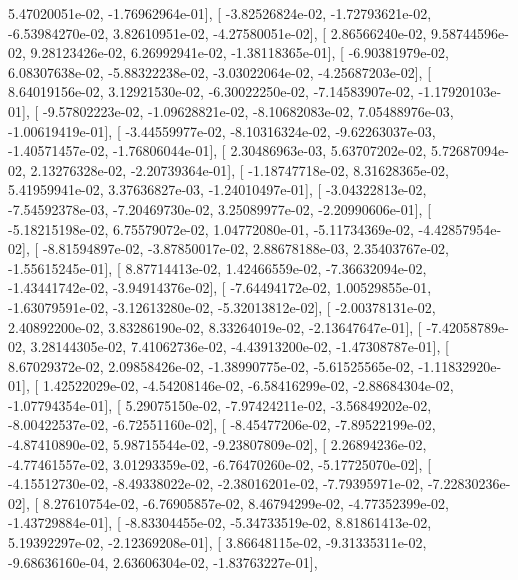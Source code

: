 \documentclass{article}
\begin{document}
          5.47020051e-02,  -1.76962964e-01],
       [ -3.82526824e-02,  -1.72793621e-02,  -6.53984270e-02,
          3.82610951e-02,  -4.27580051e-02],
       [  2.86566240e-02,   9.58744596e-02,   9.28123426e-02,
          6.26992941e-02,  -1.38118365e-01],
       [ -6.90381979e-02,   6.08307638e-02,  -5.88322238e-02,
         -3.03022064e-02,  -4.25687203e-02],
       [  8.64019156e-02,   3.12921530e-02,  -6.30022250e-02,
         -7.14583907e-02,  -1.17920103e-01],
       [ -9.57802223e-02,  -1.09628821e-02,  -8.10682083e-02,
          7.05488976e-03,  -1.00619419e-01],
       [ -3.44559977e-02,  -8.10316324e-02,  -9.62263037e-03,
         -1.40571457e-02,  -1.76806044e-01],
       [  2.30486963e-03,   5.63707202e-02,   5.72687094e-02,
          2.13276328e-02,  -2.20739364e-01],
       [ -1.18747718e-02,   8.31628365e-02,   5.41959941e-02,
          3.37636827e-03,  -1.24010497e-01],
       [ -3.04322813e-02,  -7.54592378e-03,  -7.20469730e-02,
          3.25089977e-02,  -2.20990606e-01],
       [ -5.18215198e-02,   6.75579072e-02,   1.04772080e-01,
         -5.11734369e-02,  -4.42857954e-02],
       [ -8.81594897e-02,  -3.87850017e-02,   2.88678188e-03,
          2.35403767e-02,  -1.55615245e-01],
       [  8.87714413e-02,   1.42466559e-02,  -7.36632094e-02,
         -1.43441742e-02,  -3.94914376e-02],
       [ -7.64494172e-02,   1.00529855e-01,  -1.63079591e-02,
         -3.12613280e-02,  -5.32013812e-02],
       [ -2.00378131e-02,   2.40892200e-02,   3.83286190e-02,
          8.33264019e-02,  -2.13647647e-01],
       [ -7.42058789e-02,   3.28144305e-02,   7.41062736e-02,
         -4.43913200e-02,  -1.47308787e-01],
       [  8.67029372e-02,   2.09858426e-02,  -1.38990775e-02,
         -5.61525565e-02,  -1.11832920e-01],
       [  1.42522029e-02,  -4.54208146e-02,  -6.58416299e-02,
         -2.88684304e-02,  -1.07794354e-01],
       [  5.29075150e-02,  -7.97424211e-02,  -3.56849202e-02,
         -8.00422537e-02,  -6.72551160e-02],
       [ -8.45477206e-02,  -7.89522199e-02,  -4.87410890e-02,
          5.98715544e-02,  -9.23807809e-02],
       [  2.26894236e-02,  -4.77461557e-02,   3.01293359e-02,
         -6.76470260e-02,  -5.17725070e-02],
       [ -4.15512730e-02,  -8.49338022e-02,  -2.38016201e-02,
         -7.79395971e-02,  -7.22830236e-02],
       [  8.27610754e-02,  -6.76905857e-02,   8.46794299e-02,
         -4.77352399e-02,  -1.43729884e-01],
       [ -8.83304455e-02,  -5.34733519e-02,   8.81861413e-02,
          5.19392297e-02,  -2.12369208e-01],
       [  3.86648115e-02,  -9.31335311e-02,  -9.68636160e-04,
          2.63606304e-02,  -1.83763227e-01],
\end{document}
